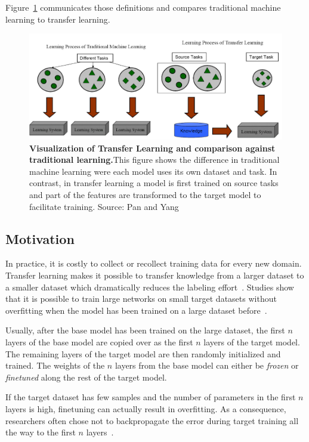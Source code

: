 Figure~\ref{fig:03_transferLearning} communicates those definitions and compares traditional machine learning to transfer learning.
\begin{figure}[ht]
    \centering
    \includegraphics[scale=0.55]{figures/03_theory/03_transferLearning}
    \caption{\textbf{Visualization of Transfer Learning and comparison against traditional learning.}This figure shows the difference in traditional machine learning were each model uses its own dataset and task. In contrast, in transfer learning a model is first trained on source tasks and part of the features are transformed to the target model to facilitate training. Source: Pan and Yang~\cite{Pan2010}}
    \label{fig:03_transferLearning}
\end{figure}

\subsection*{Motivation}

In practice, it is costly to collect or recollect training data for every new domain. Transfer learning makes it possible to transfer knowledge from a larger dataset to a smaller dataset which dramatically reduces the labeling effort~\cite{Blitzer2007}. Studies show that it is possible to train large networks on small target datasets without overfitting when the model has been trained on a large dataset before~\cite{Donahue2013, Zeiler2014}. 

Usually, after the base model has been trained on the large dataset, the first $n$ layers of the base model are copied over as the first $n$ layers of the target model. The remaining layers of the target model are then randomly initialized and trained. The weights of the $n$ layers from the base model can either be \textit{frozen} or \textit{finetuned} along the rest of the target model. 

If the target dataset has few samples and the number of parameters in the first $n$ layers is high, finetuning can actually result in overfitting. As a consequence, researchers often chose not to backpropagate the error during target training all the way to the first $n$ layers~\cite{Yosinski2014}.


